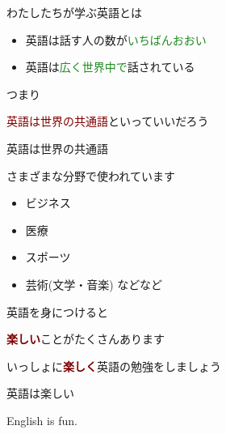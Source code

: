 \documentclass[
  ignorenonframetext,
  aspectratio=169,
  xcolor=dvipsnames]{beamer}
\providecommand{\tightlist}{%
  \setlength{\itemsep}{0pt}\setlength{\parskip}{0pt}}
\begin{document}
\begin{frame}{わたしたちが学ぶ英語とは}
\protect{}\label{ux308fux305fux3057ux305fux3061ux304cux5b66ux3076ux82f1ux8a9eux3068ux306f}
\Large

\begin{itemize}[<+->]
\tightlist
\item
  英語は話す人の数が\textcolor{ForestGreen}{いちばんおおい}
\item
  英語は\textcolor{ForestGreen}{広く世界中で}話されている
\end{itemize}

つまり\pause

\textcolor{Maroon}{英語は世界の共通語}といっていいだろう
\end{frame}

\begin{frame}{英語は世界の共通語}
\protect{}\label{ux82f1ux8a9eux306fux4e16ux754cux306eux5171ux901aux8a9e}
\Large

さまざまな分野で使われています

\begin{itemize}[<+->]
\tightlist
\item
  ビジネス
\item
  医療
\item
  スポーツ
\item
  芸術(文学・音楽) などなど
\end{itemize}
\end{frame}

\begin{frame}{英語を身につけると}
\protect{}\label{ux82f1ux8a9eux3092ux8eabux306bux3064ux3051ux308bux3068}
\Large

\textcolor{Maroon}{\bfseries 楽しい}ことがたくさんあります\pause

いっしょに\textcolor{Maroon}{\bfseries 楽しく}英語の勉強をしましょう
\end{frame}

\begin{frame}{英語は楽しい}
\protect{}\label{ux82f1ux8a9eux306fux697dux3057ux3044}
\Huge

\centering

English is fun.
\end{frame}

\begin{frame}{}
\protect{}\label{section-4}
\end{frame}
\end{document}
